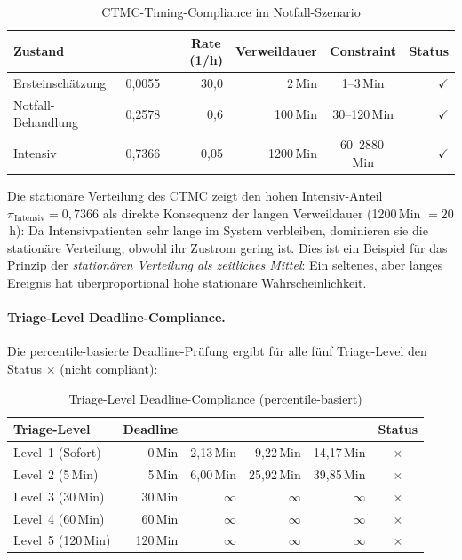 ﻿\documentclass[a4paper,12pt]{scrreprt}
\theoremstyle{definition}
\begin{document}
\begin{table}[H]
	\centering
	\begin{tabular}{@{}lrrrcr@{}}
		\toprule
		\textbf{Zustand} & \boldmath{$\pi_i$} & \textbf{Rate}\,(1/h) &
		\textbf{Verweildauer} & \textbf{Constraint} & \textbf{Status} \\
		\midrule
		Ersteinschätzung  & 0{,}0055 & 30{,}0 &  2\,Min & 1--3\,Min   & $\checkmark$ \\
		Notfall-Behandlung& 0{,}2578 &  0{,}6 & 100\,Min& 30--120\,Min& $\checkmark$ \\
		Intensiv          & 0{,}7366 & 0{,}05 &1200\,Min& 60--2880\,Min&$\checkmark$ \\
		\bottomrule
	\end{tabular}
	\caption{CTMC-Timing-Compliance im Notfall-Szenario}
	\label{tab:ctmc-compliance-auswertung}
\end{table}

Die stationäre Verteilung des CTMC zeigt den hohen Intensiv-Anteil
$\pi_\text{Intensiv} = 0{,}7366$ als direkte Konsequenz der langen
Verweildauer (1200\,Min $= 20$\,h): Da Intensivpatienten sehr lange
im System verbleiben, dominieren sie die stationäre Verteilung,
obwohl ihr Zustrom gering ist. Dies ist ein Beispiel für das Prinzip
der \emph{stationären Verteilung als zeitliches Mittel}: Ein seltenes,
aber langes Ereignis hat überproportional hohe stationäre Wahrscheinlichkeit.

\paragraph{Triage-Level Deadline-Compliance.}
Die percentile-basierte Deadline-Prüfung ergibt für alle fünf Triage-Level
den Status $\times$ (nicht compliant):

\begin{table}[H]
	\centering
	\begin{tabular}{@{}lrrrrc@{}}
		\toprule
		\textbf{Triage-Level} & \textbf{Deadline} & \boldmath{$t_{0{,}50}$} &
		\boldmath{$t_{0{,}95}$} & \boldmath{$t_{0{,}99}$} & \textbf{Status} \\
		\midrule
		Level~1 (Sofort)   & 0\,Min  &  2{,}13\,Min &  9{,}22\,Min & 14{,}17\,Min & $\times$ \\
		Level~2 (5\,Min)   & 5\,Min  &  6{,}00\,Min & 25{,}92\,Min & 39{,}85\,Min & $\times$ \\
		Level~3 (30\,Min)  & 30\,Min & $\infty$     & $\infty$     & $\infty$     & $\times$ \\
		Level~4 (60\,Min)  & 60\,Min & $\infty$     & $\infty$     & $\infty$     & $\times$ \\
		Level~5 (120\,Min) &120\,Min & $\infty$     & $\infty$     & $\infty$     & $\times$ \\
		\bottomrule
	\end{tabular}
	\caption{Triage-Level Deadline-Compliance (percentile-basiert)}
	\label{tab:triage-compliance}
\end{table}
\end{document}
